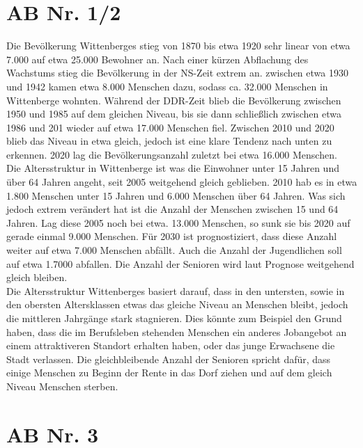 \documentclass[12pt,a4paper]{report}
\begin{document}
	\section{AB Nr. 1/2}
	Die Bevölkerung Wittenberges stieg von 1870 bis etwa 1920 sehr linear von etwa 7.000 auf etwa 25.000 Bewohner an.
	Nach einer kürzen Abflachung des Wachstums stieg die Bevölkerung in der NS-Zeit extrem an.
	zwischen etwa 1930 und 1942 kamen etwa 8.000 Menschen dazu, sodass ca. 32.000 Menschen in Wittenberge wohnten.
	Während der DDR-Zeit blieb die Bevölkerung zwischen 1950 und 1985 auf dem gleichen Niveau, bis sie dann schließlich zwischen etwa 1986 und 201 wieder auf etwa 17.000 Menschen fiel.
	Zwischen 2010 und 2020 blieb das Niveau in etwa gleich, jedoch ist eine klare Tendenz nach unten zu erkennen.
	2020 lag die Bevölkerungsanzahl zuletzt bei etwa 16.000 Menschen.
	\\
	Die Altersstruktur in Wittenberge ist was die Einwohner unter 15 Jahren und über 64 Jahren angeht, seit 2005 weitgehend gleich geblieben.
	2010 hab es in etwa 1.800 Menschen unter 15 Jahren und 6.000 Menschen über 64 Jahren.
	Was sich jedoch extrem verändert hat ist die Anzahl der Menschen zwischen 15 und 64 Jahren.
	Lag diese 2005 noch bei etwa. 13.000 Menschen, so sunk sie bis 2020 auf gerade einmal 9.000 Menschen.
	Für 2030 ist prognostiziert, dass diese Anzahl weiter auf etwa 7.000 Menschen abfällt.
	Auch die Anzahl der Jugendlichen soll auf etwa 1.7000 abfallen.
	Die Anzahl der Senioren wird laut Prognose weitgehend gleich bleiben.
	\\
	Die Altersstruktur Wittenberges basiert darauf, dass in den untersten, sowie in den obersten Altersklassen etwas das gleiche Niveau an Menschen bleibt, jedoch die mittleren Jahrgänge stark stagnieren.
	Dies könnte zum Beispiel den Grund haben, dass die im Berufsleben stehenden Menschen ein anderes Jobangebot an einem attraktiveren Standort erhalten haben, oder das junge Erwachsene die Stadt verlassen.
	Die gleichbleibende Anzahl der Senioren spricht dafür, dass einige Menschen zu Beginn der Rente in das Dorf ziehen und auf dem gleich Niveau Menschen sterben.
	\section{AB Nr. 3}
\end{document}
